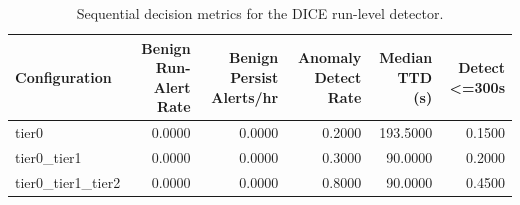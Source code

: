 \begin{table}[t]
\centering
\caption{Sequential decision metrics for the DICE run-level detector.}
\label{tab:dice_sequential_metrics}
\footnotesize
\begin{tabular}{lrrrrr}
\toprule
Configuration & Benign Run-Alert Rate & Benign Persist Alerts/hr & Anomaly Detect Rate & Median TTD (s) & Detect <=300s \\
\midrule
tier0 & 0.0000 & 0.0000 & 0.2000 & 193.5000 & 0.1500 \\
tier0_tier1 & 0.0000 & 0.0000 & 0.3000 & 90.0000 & 0.2000 \\
tier0_tier1_tier2 & 0.0000 & 0.0000 & 0.8000 & 90.0000 & 0.4500 \\
\bottomrule
\end{tabular}

\end{table}
